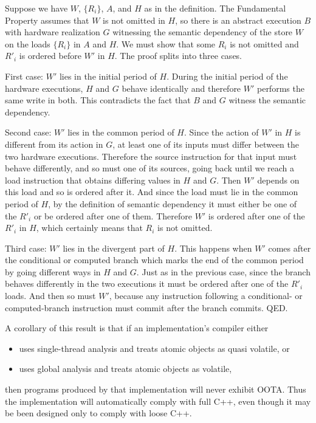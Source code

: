 \documentclass[10]{article}
\begin{document}
Suppose we have $W$, $\{R_i\}$, $A$, and $H$ as in the definition.
The Fundamental Property assumes that $W$ is not omitted in $H$, so
there is an abstract execution $B$ with hardware realization $G$
witnessing the semantic dependency of the store $W$ on the loads
$\{R_i\}$ in $A$ and $H$.
We must show that some $R_i$ is not omitted and $R'_i$ is ordered
before $W'$ in $H$.
The proof splits into three cases.

First case: $W'$ lies in the initial period of $H$.
During the initial period of the hardware executions, $H$ and $G$
behave identically and therefore $W'$ performs the same write in
both.
This contradicts the fact that $B$ and $G$ witness the semantic
dependency.

Second case: $W'$ lies in the common period of $H$.
Since the action of $W'$ in $H$ is different from its action in $G$,
at least one of its inputs must differ between the two hardware
executions.
Therefore the source instruction for that input must behave
differently, and so must one of its sources, going back until we reach
a load instruction that obtains differing values in $H$ and $G$.
Then $W'$ depends on this load and so is ordered after it.
And since the load must lie in the common period of $H$, by the
definition of semantic dependency it must either be one of the
$R'_i$ or be ordered after one of them.
Therefore $W'$ is ordered after one of the $R'_i$ in $H$,
which certainly means that $R_i$ is not omitted.

Third case: $W'$ lies in the divergent part of $H$.
This happens when $W'$ comes after the conditional or computed branch
which marks the end of the common period by going different ways in
$H$ and $G$.
Just as in the previous case, since the branch behaves differently in
the two executions it must be ordered after one of the $R'_i$ loads.
And then so must $W'$, because any instruction following a conditional-
or computed-branch instruction must commit after the branch commits.
QED.

\medskip

A corollary of this result is that if an implementation's compiler
either
\begin{itemize}
\item	uses single-thread analysis and treats atomic objects as
	quasi volatile, or
\item	uses global analysis and treats atomic objects as volatile,
\end{itemize}
then programs produced by that implementation will never exhibit OOTA.
Thus the implementation will automatically comply with full C++, even
though it may be been designed only to comply with loose C++.
\end{document}
